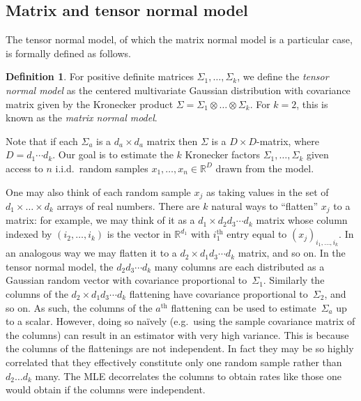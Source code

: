 \documentclass[aos]{imsart}
\theoremstyle{definition}
\newtheorem*{definition}{Definition}
\numberwithin{equation}{section}
\newcommand{\R}{{\mathbb{R}}}
\newcommand{\ot}{\otimes}
\begin{document}
\subsection{Matrix and tensor normal model}\label{subsec:model}
The tensor normal model, of which the matrix normal model is a particular case, is formally defined as follows.

\begin{definition}
For positive definite matrices $\Sigma_1,\dots,\Sigma_k$, we define the \emph{tensor normal model} as the centered multivariate Gaussian distribution with covariance matrix given by the Kronecker product $\Sigma = \Sigma_1 \ot \dots \ot \Sigma_k$.
For $k=2$, this is known as the \emph{matrix normal model}.
\end{definition}

\noindent
Note that if each $\Sigma_a$ is a $d_a\times d_a$ matrix then $\Sigma$ is a $D\times D$-matrix, where $D=d_1 \cdots d_k$.
Our goal is to estimate the $k$ Kronecker factors $\Sigma_1, \dots, \Sigma_k$ given access to $n$ i.i.d.\ random samples $x_1, \dots, x_n \in \R^D$ drawn from the model.

One may also think of each random sample $x_j$ as taking values in the set of $d_1 \times \dots \times d_k$ arrays of real numbers.
There are $k$ natural ways to ``flatten'' $x_j$ to a matrix:
for example, we may think of it as a $d_1 \times d_2d_3\cdots{}d_k$ matrix whose column indexed by $(i_2,\dots, i_k)$ is the vector in $\R^{d_1}$ with $i_1^{\text{th}}$ entry equal to $(x_j)_{i_1, \dots, i_k}$.
In an analogous way we may flatten it to a $d_2 \times d_1d_3\cdots{}d_k$ matrix, and so on.
In the tensor normal model, the $d_2d_3\cdots{}d_k$ many columns are each distributed as a Gaussian random vector with covariance proportional to~$\Sigma_1$.
Similarly the columns of the $d_2 \times d_1d_3\cdots{}d_k$ flattening have covariance proportional to~$\Sigma_2$, and so on.
As such, the columns of the $a^{\text{th}}$ flattening can be used to estimate~$\Sigma_a$ up to a scalar.
However, doing so na\"ively (e.g.\ using the sample covariance matrix of the columns) can result in an estimator with very high variance.
This is because the columns of the flattenings are not independent.
In fact they may be so highly correlated that they effectively constitute only one random sample rather than $d_2\dots d_k$ many.
The MLE decorrelates the columns to obtain rates like those one would obtain if the columns were independent.
\end{document}
